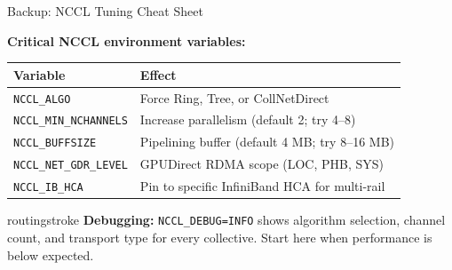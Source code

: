 \documentclass[aspectratio=169, 12pt]{beamer}
\begin{document}
\begin{frame}{Backup: NCCL Tuning Cheat Sheet}
\note{
[2 min]
}

\footnotesize
\textbf{Critical NCCL environment variables:}

\vspace{0.1cm}
\renewcommand{\arraystretch}{1.1}
\begin{tabular}{@{}lp{6.5cm}@{}}
  \toprule
  \textbf{Variable} & \textbf{Effect} \\
  \midrule
  \texttt{NCCL\_ALGO}           & Force Ring, Tree, or CollNetDirect \\
  \texttt{NCCL\_MIN\_NCHANNELS} & Increase parallelism (default 2; try 4--8) \\
  \texttt{NCCL\_BUFFSIZE}       & Pipelining buffer (default 4 MB; try 8--16 MB) \\
  \texttt{NCCL\_NET\_GDR\_LEVEL} & GPUDirect RDMA scope (LOC, PHB, SYS) \\
  \texttt{NCCL\_IB\_HCA}        & Pin to specific InfiniBand HCA for multi-rail \\
  \bottomrule
\end{tabular}

\vspace{0.1cm}
\begin{mlsyscard}{routingstroke}
{\scriptsize\textbf{Debugging:} \texttt{NCCL\_DEBUG=INFO} shows algorithm selection, channel count, and transport type for every collective. Start here when performance is below expected.}
\end{mlsyscard}

\end{frame}
\end{document}
